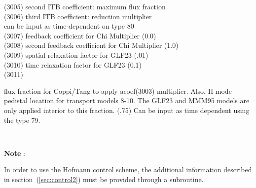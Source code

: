 \begin{tabbing}
(3005) \> second ITB coefficient: maximum flux fraction \\
(3006) \> third ITB coefficient:  reduction multiplier \\
       \> can be input as time-dependent on type 80 \\
(3007) \> feedback coefficient for Chi Multiplier (0.0) \\
(3008) \> second feedback coefficient for Chi Multiplier (1.0) \\
(3009) \> spatial relaxation factor for GLF23 (.01) \\
(3010) \> time relaxation factor for GLF23 (0.1) \\
(3011) \> \parbox[t]{\width}{flux fraction for Coppi/Tang to apply acoef(3003) multiplier.  Also, H-mode pedistal location for transport models 8-10.
The GLF23 and MMM95 models are only applied interior to this fraction. (.75)    Can be input as time dependent
using the type 79.} \\
\end{tabbing} 
{\bf Note} : \parbox[t]{\width}{In order to use the Hofmann control scheme, the additional
information described in section~(\ref{sec:control2}) must be provided through a subroutine.}\\
